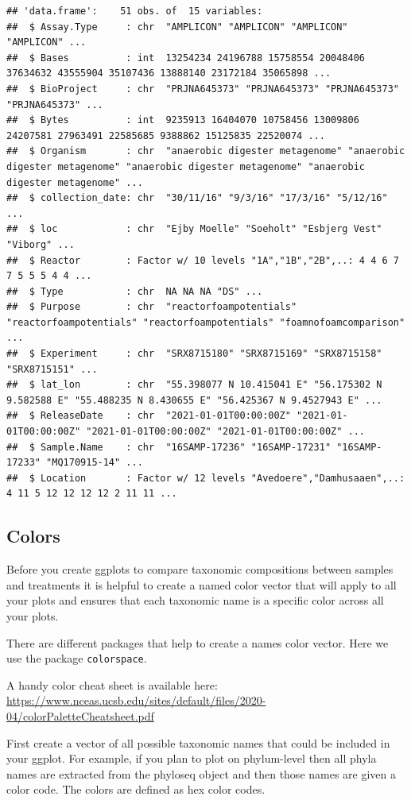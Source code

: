 \documentclass[
]{book}
\begin{document}
\begin{verbatim}
## 'data.frame':    51 obs. of  15 variables:
##  $ Assay.Type     : chr  "AMPLICON" "AMPLICON" "AMPLICON" "AMPLICON" ...
##  $ Bases          : int  13254234 24196788 15758554 20048406 37634632 43555904 35107436 13888140 23172184 35065898 ...
##  $ BioProject     : chr  "PRJNA645373" "PRJNA645373" "PRJNA645373" "PRJNA645373" ...
##  $ Bytes          : int  9235913 16404070 10758456 13009806 24207581 27963491 22585685 9388862 15125835 22520074 ...
##  $ Organism       : chr  "anaerobic digester metagenome" "anaerobic digester metagenome" "anaerobic digester metagenome" "anaerobic digester metagenome" ...
##  $ collection_date: chr  "30/11/16" "9/3/16" "17/3/16" "5/12/16" ...
##  $ loc            : chr  "Ejby Moelle" "Soeholt" "Esbjerg Vest" "Viborg" ...
##  $ Reactor        : Factor w/ 10 levels "1A","1B","2B",..: 4 4 6 7 7 5 5 5 4 4 ...
##  $ Type           : chr  NA NA NA "DS" ...
##  $ Purpose        : chr  "reactorfoampotentials" "reactorfoampotentials" "reactorfoampotentials" "foamnofoamcomparison" ...
##  $ Experiment     : chr  "SRX8715180" "SRX8715169" "SRX8715158" "SRX8715151" ...
##  $ lat_lon        : chr  "55.398077 N 10.415041 E" "56.175302 N 9.582588 E" "55.488235 N 8.430655 E" "56.425367 N 9.4527943 E" ...
##  $ ReleaseDate    : chr  "2021-01-01T00:00:00Z" "2021-01-01T00:00:00Z" "2021-01-01T00:00:00Z" "2021-01-01T00:00:00Z" ...
##  $ Sample.Name    : chr  "16SAMP-17236" "16SAMP-17231" "16SAMP-17233" "MQ170915-14" ...
##  $ Location       : Factor w/ 12 levels "Avedoere","Damhusaaen",..: 4 11 5 12 12 12 12 2 11 11 ...
\end{verbatim}

\hypertarget{colors-1}{%
\subsection{Colors}\label{colors-1}}

Before you create ggplots to compare taxonomic compositions between samples and treatments it is helpful to create a named color vector that will apply to all your plots and ensures that each taxonomic name is a specific color across all your plots.

There are different packages that help to create a names color vector. Here we use the package \texttt{colorspace}.

A handy color cheat sheet is available here: \url{https://www.nceas.ucsb.edu/sites/default/files/2020-04/colorPaletteCheatsheet.pdf}

First create a vector of all possible taxonomic names that could be included in your ggplot. For example, if you plan to plot on phylum-level then all phyla names are extracted from the phyloseq object and then those names are given a color code. The colors are defined as hex color codes.
\end{document}
